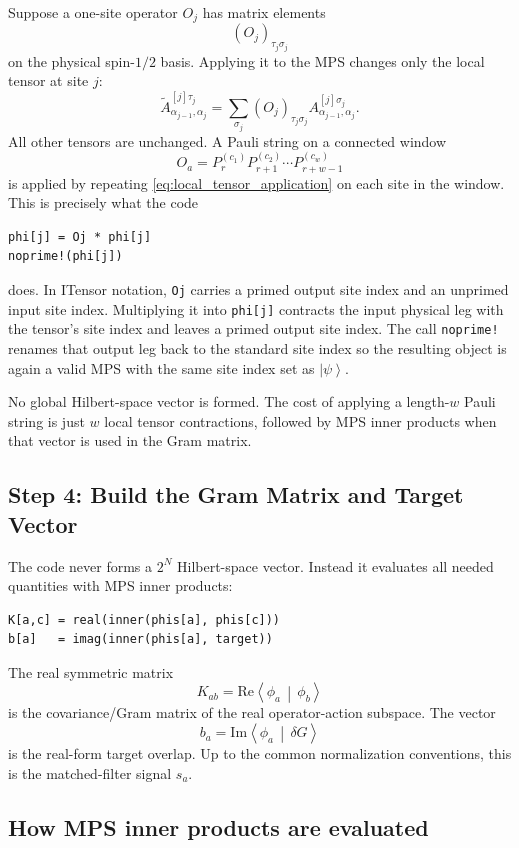 \documentclass[11pt]{article}
\newcommand{\ket}[1]{\left|#1\right\rangle}
\newcommand{\braket}[2]{\left\langle#1\,\middle|\,#2\right\rangle}
\newcommand{\dd}{\delta}
\begin{document}
Suppose a one-site operator $O_j$ has matrix elements
\[
  (O_j)_{\tau_j\sigma_j}
\]
on the physical spin-$1/2$ basis.  Applying it to the MPS changes only
the local tensor at site $j$:
\begin{equation}
  \widetilde A^{[j]\tau_j}_{\alpha_{j-1},\alpha_j}
  =
  \sum_{\sigma_j}
  (O_j)_{\tau_j\sigma_j}
  A^{[j]\sigma_j}_{\alpha_{j-1},\alpha_j}.
  \label{eq:local_tensor_application}
\end{equation}
All other tensors are unchanged.  A Pauli string on a connected window
\[
  O_a
  =
  P_{r}^{(c_1)}
  P_{r+1}^{(c_2)}
  \cdots
  P_{r+w-1}^{(c_w)}
\]
is applied by repeating \eqref{eq:local_tensor_application} on each site
in the window.  This is precisely what the code
\begin{lstlisting}
phi[j] = Oj * phi[j]
noprime!(phi[j])
\end{lstlisting}
does.  In ITensor notation, \texttt{Oj} carries a primed output site
index and an unprimed input site index.  Multiplying it into
\texttt{phi[j]} contracts the input physical leg with the tensor's site
index and leaves a primed output site index.  The call
\texttt{noprime!} renames that output leg back to the standard site
index so the resulting object is again a valid MPS with the same site
index set as $\ket{\psi}$.

No global Hilbert-space vector is formed.  The cost of applying a
length-$w$ Pauli string is just $w$ local tensor contractions, followed
by MPS inner products when that vector is used in the Gram matrix.

\subsection{Step 4: Build the Gram Matrix and Target Vector}

The code never forms a $2^N$ Hilbert-space vector.  Instead it evaluates
all needed quantities with MPS inner products:
\begin{lstlisting}
K[a,c] = real(inner(phis[a], phis[c]))
b[a]   = imag(inner(phis[a], target))
\end{lstlisting}
The real symmetric matrix
\[
  K_{ab}
  =
  \mathrm{Re}\braket{\phi_a}{\phi_b}
\]
is the covariance/Gram matrix of the real operator-action subspace.
The vector
\[
  b_a
  =
  \mathrm{Im}\braket{\phi_a}{\dd G}
\]
is the real-form target overlap.  Up to the common normalization
conventions, this is the matched-filter signal $s_a$.

\subsection{How MPS inner products are evaluated}
\end{document}
